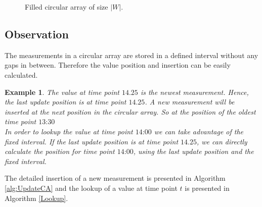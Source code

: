 \documentclass[abstracton,12pt]{scrreprt}
\newtheorem{example}{Example}
\begin{document}
\begin{itemize}
\begin{figure}[H]
		\vspace{2mm}
		\caption{Filled circular array of size $|W|$.}
		\label{fig:cat}
	\end{figure}
\end{itemize}

\subsection{Observation}
The measurements in a circular array are stored in a defined interval without any gaps in between. Therefore the value position and insertion can be easily calculated.
\begin{example}
The value at time point $\text{14.25}$ is the newest measurement. Hence, the last update position is at time point $\text{14.25}$. A new measurement will be inserted at the next position in the circular array. So at the position of the oldest time point $\text{13:30}$\\
In order to lookup the value at time point $\text{14:00}$ we can take advantage of the fixed interval. If the last update position is at time point $\text{14.25}$, we can directly calculate the position for time point $\text{14:00}$, using the last update position and the fixed interval.
\end{example} 
The detailed insertion of a new measurement is presented in Algorithm \ref{alg:UpdateCA} and the lookup of a value at time point $t$ is presented in Algorithm \ref{Lookup}.
\end{document}

